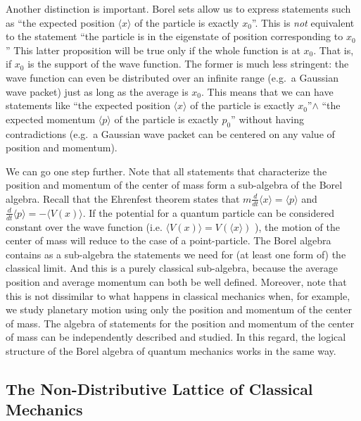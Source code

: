 \documentclass[11pt, executivepaper]{article}
\begin{document}
Another distinction is important. Borel sets allow us to express statements such as ``the expected position $\langle x \rangle$ of the particle is exactly $x_0$''. This is \emph{not} equivalent to the statement ``the particle is in the eigenstate of position corresponding to $x_0$'' This latter proposition will be true only if the whole function is at $x_0$. That is, if $x_0$ is the support of the wave function. The former is much less stringent: the wave function can even be distributed over an infinite range (e.g.\ a Gaussian wave packet) just as long as the average is $x_0$. This means that we can have statements like ``the expected position $\langle x \rangle$ of the particle is exactly $x_0$''$\wedge$ ``the expected momentum $\langle p \rangle$ of the particle is exactly $p_0$'' without having contradictions (e.g.\ a Gaussian wave packet can be centered on any value of position and momentum).

We can go one step further. Note that all statements that characterize the position and momentum of the center of mass form a sub-algebra of the Borel algebra. Recall that the Ehrenfest theorem states that $m \frac{d}{dt}\langle x \rangle = \langle p \rangle$ and $ \frac{d}{dt}\langle p \rangle = - \langle V(x) \rangle$. If the potential for a quantum particle can be considered constant over the wave function (i.e. $\langle V(x) \rangle = V(\langle x \rangle)$ ), the motion of the center of mass will reduce to the case of a point-particle. The Borel algebra contains as a sub-algebra the statements we need for (at least one form of) the classical limit. And this is a purely classical sub-algebra, because the average position and average momentum can both be well defined. Moreover, note that this is not dissimilar to what happens in classical mechanics when, for example, we study planetary motion using only the position and momentum of the center of mass. The algebra of statements for the position and momentum of the center of mass can be independently described and studied. In this regard, the logical structure of the Borel algebra of quantum mechanics works in the same way.

\subsection{The Non-Distributive Lattice of Classical Mechanics}
\end{document}
